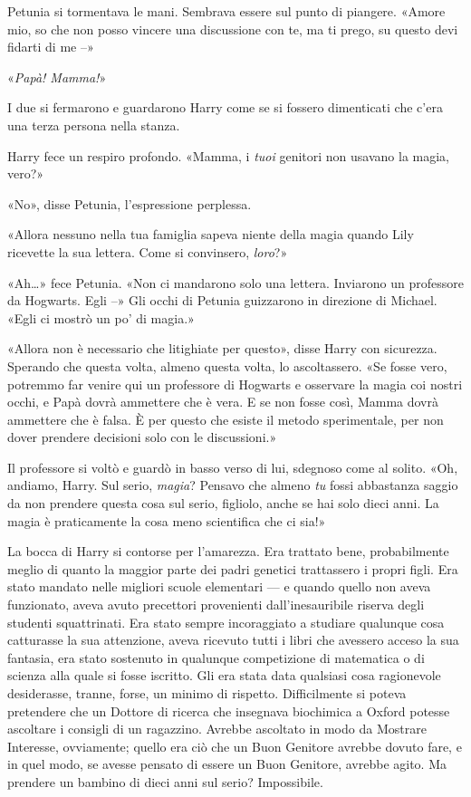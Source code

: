 Petunia si tormentava le mani. Sembrava essere sul punto di piangere. «Amore mio, so che non posso vincere una discussione con te, ma ti prego, su questo devi fidarti di me –»

«\emph{Papà! Mamma!}»

I due si fermarono e guardarono Harry come se si fossero dimenticati che c’era una terza persona nella stanza.

Harry fece un respiro profondo. «Mamma, i \emph{tuoi} genitori non usavano la magia, vero?»

«No», disse Petunia, l’espressione perplessa.

«Allora nessuno nella tua famiglia sapeva niente della magia quando Lily ricevette la sua lettera. Come si convinsero, \emph{loro}?»

«Ah…» fece Petunia. «Non ci mandarono solo una lettera. Inviarono un professore da Hogwarts. Egli –» Gli occhi di Petunia guizzarono in direzione di Michael. «Egli ci mostrò un po’ di magia.»

«Allora non è necessario che litighiate per questo», disse Harry con sicurezza. Sperando che questa volta, almeno questa volta, lo ascoltassero. «Se fosse vero, potremmo far venire qui un professore di Hogwarts e osservare la magia coi nostri occhi, e Papà dovrà ammettere che è vera. E se non fosse così, Mamma dovrà ammettere che è falsa. È per questo che esiste il metodo sperimentale, per non dover prendere decisioni solo con le discussioni.»

Il professore si voltò e guardò in basso verso di lui, sdegnoso come al solito. «Oh, andiamo, Harry. Sul serio, \emph{magia}? Pensavo che almeno \emph{tu} fossi abbastanza saggio da non prendere questa cosa sul serio, figliolo, anche se hai solo dieci anni. La magia è praticamente la cosa meno scientifica che ci sia!»

La bocca di Harry si contorse per l’amarezza. Era trattato bene, probabilmente meglio di quanto la maggior parte dei padri genetici trattassero i propri figli. Era stato mandato nelle migliori scuole elementari — e quando quello non aveva funzionato, aveva avuto precettori provenienti dall’inesauribile riserva degli studenti squattrinati. Era stato sempre incoraggiato a studiare qualunque cosa catturasse la sua attenzione, aveva ricevuto tutti i libri che avessero acceso la sua fantasia, era stato sostenuto in qualunque competizione di matematica o di scienza alla quale si fosse iscritto. Gli era stata data qualsiasi cosa ragionevole desiderasse, tranne, forse, un minimo di rispetto. Difficilmente si poteva pretendere che un Dottore di ricerca che insegnava biochimica a Oxford potesse ascoltare i consigli di un ragazzino. Avrebbe ascoltato in modo da Mostrare Interesse, ovviamente; quello era ciò che un Buon Genitore avrebbe dovuto fare, e in quel modo, se avesse pensato di essere un Buon Genitore, avrebbe agito. Ma prendere un bambino di dieci anni sul serio? Impossibile.

